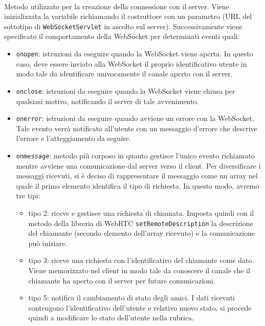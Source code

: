\begin{description}
  \item{}\\
  Metodo utilizzato per la creazione della connessione con il server. Viene inizializzata la variabile  richiamando il costruttore con un parametro (URL del sottotipo di \verb'WebSocketServlet' in ascolto sul server). Successivamente viene specificato il comportamento della WebSocket per determinati eventi quali:
  \begin{itemize}
    \item \texttt{onopen}: istruzioni da eseguire quando la WebSocket viene aperta. In questo caso, deve essere inviato alla WebSocket il proprio identificativo utente in modo tale da identificare univocamente il canale aperto con il server.
    \item \texttt{onclose}: istruzioni da eseguire quando la WebSocket viene chiusa per qualsiasi motivo, notificando il server di tale avvenimento.
    \item \texttt{onerror}: istruzioni da eseguire quando avviene un errore con la WebSocket. Tale evento verrà notificato all'utente con un messaggio d'errore che descrive l'errore e l'atteggiamento da seguire.
    \item \texttt{onmessage}: metodo più corposo in quanto gestisce l'unico evento richiamato mentre avviene una comunicazione dal server verso il client. Per diversificare i messaggi ricevuti, si è deciso di rappresentare il messaggio come un array nel quale il primo elemento identifica il tipo di richiesta. In questo modo, avremo tre tipi:
    \begin{itemize}
      \item tipo 2: riceve e gestisce una richiesta di chiamata. Imposta quindi con il metodo della libreria di WebRTC \verb'setRemoteDescription' la descrizione del  chiamante (secondo elemento dell'array ricevuto) e la comunicazione può iniziare.
       \item tipo 3: riceve una richiesta con l'identificativo del chiamante come dato. Viene memorizzato nel client in modo tale da conoscere il canale che il chiamante ha aperto con il server per future comunicazioni.
      \item tipo 5: notifica il cambiamento di stato degli amici. I dati ricevuti contengono l'identificativo dell'utente e relativo nuovo stato, si procede quindi a modificare lo stato dell'utente nella rubrica.
    \end{itemize}
  \end{itemize}
  

\end{description}
